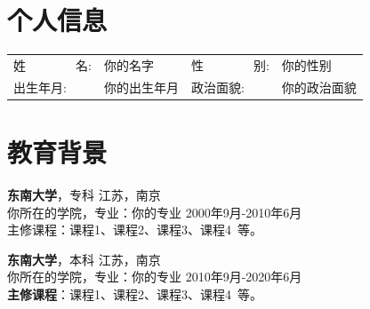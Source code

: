 \documentclass[11pt]{article}
\begin{document}
    \begin{figure}[h]
        \begin{minipage}[t]{0.78\textwidth}
            \section{\makebox[\widthof{\faAddressCard}][c]{\color{primary_color}{\faAddressCard}}\quad 个人信息}
            \begin{tabularx}{\linewidth}{p{}Xp{}X}
                姓\ \ \ \ \ \ \ \ 名: & 你的名字 & 
                性\ \ \ \ \ \ \ \ 别: & 你的性别 \\
                出生年月: & 你的出生年月 & 
                政治面貌: & 你的政治面貌 \\
            \end{tabularx}
            
            \vspace{0.2em}
    
            \section{\makebox[\widthof{\faGraduationCap}][c]{\color{primary_color}{\faGraduationCap}}\quad 教育背景}
            
            {\large \textbf{东南大学}}，专科 \hfill {江苏，南京} \\
            {{你所在的学院}}，专业：你的专业 \hfill {2000年9月-2010年6月} \\
            {主修课程}：课程1、课程2、课程3、课程4\ 等。
            
            \vspace{0.5em}
            {\large \textbf{东南大学}}，本科 \hfill {江苏，南京} \\
            {{你所在的学院}}，专业：你的专业 \hfill {2010年9月-2020年6月} \\
            \textbf{主修课程}：课程1、课程2、课程3、课程4\ 等。
            

\end{minipage}
\end{figure}
\end{document}
